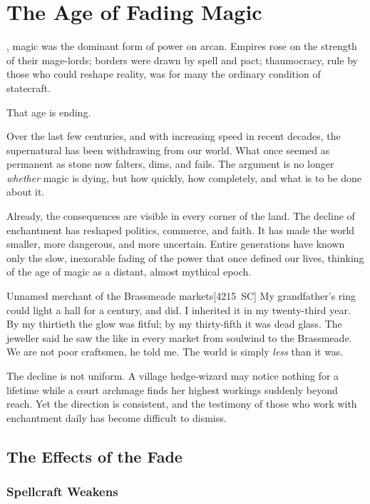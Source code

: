 \chapter{The Age of Fading Magic}

, magic was the dominant form of power on \gls{arcan}. Empires rose on the strength of their mage-lords; borders were drawn by spell and pact; \gls{thaumocracy}, rule by those who could reshape reality, was for many the ordinary condition of statecraft.

That age is ending.

Over the last few centuries, and with increasing speed in recent decades, the supernatural has been withdrawing from our world. What once seemed as permanent as stone now falters, dims, and fails. The argument is no longer \emph{whether} magic is dying, but how quickly, how completely, and what is to be done about it.

Already, the consequences are visible in every corner of the land. The decline of enchantment has reshaped politics, commerce, and faith. It has made the world smaller, more dangerous, and more uncertain. Entire generations have known only the slow, inexorable fading of the power that once defined our lives, thinking of the age of magic as a distant, almost mythical epoch.

\begin{DndQuote}{Unnamed merchant of the Brassmeade markets}[4215~SC]
  My grandfather's ring could light a hall for a century, and did. I inherited it in my twenty-third year. By my thirtieth the glow was fitful; by my thirty-fifth it was dead glass. The jeweller said he saw the like in every market from \gls{soulwind} to the Brassmeade. We are not poor craftsmen, he told me. The world is simply \emph{less} than it was.
\end{DndQuote}

The decline is not uniform. A village hedge-wizard may notice nothing for a lifetime while a court archmage finds her highest workings suddenly beyond reach. Yet the direction is consistent, and the testimony of those who work with enchantment daily has become difficult to dismiss.

\section{The Effects of the Fade}

\subsection{Spellcraft Weakens}

